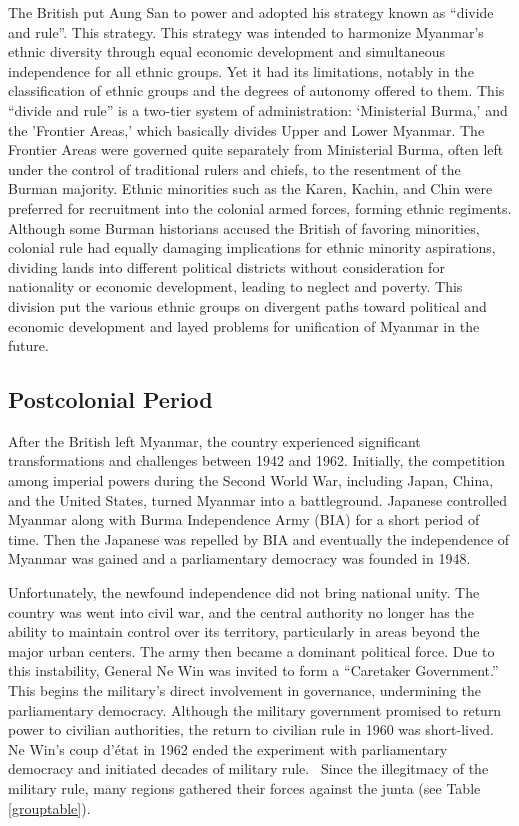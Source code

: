 \documentclass{article}
\begin{document}
The British put Aung San to power and adopted his strategy known as ``divide and rule''. This strategy. This strategy was intended to harmonize Myanmar's ethnic diversity through equal economic development and simultaneous independence for all ethnic groups. Yet it had its limitations, notably in the classification of ethnic groups and the degrees of autonomy offered to them. This ``divide and rule'' is a two-tier system of administration: `Ministerial Burma,' and the 'Frontier Areas,' which basically divides Upper and Lower Myanmar. The Frontier Areas were governed quite separately from Ministerial Burma, often left under the control of traditional rulers and chiefs, to the resentment of the Burman majority. Ethnic minorities such as the Karen, Kachin, and Chin were preferred for recruitment into the colonial armed forces, forming ethnic regiments. Although some Burman historians accused the British of favoring minorities, colonial rule had equally damaging implications for ethnic minority aspirations, dividing lands into different political districts without consideration for nationality or economic development, leading to neglect and poverty. This division put the various ethnic groups on divergent paths toward political and economic development and layed problems for unification of Myanmar in the future.\autocite[18-23]{smithEthnicGroupsBurma1994}


\subsection{Postcolonial Period}

After the British left Myanmar, the country experienced significant transformations and challenges between 1942 and 1962. Initially, the competition among imperial powers during the Second World War, including Japan, China, and the United States, turned Myanmar into a battleground. Japanese controlled Myanmar along with Burma Independence Army (BIA) for a short period of time. Then the Japanese was repelled by BIA and eventually the independence of Myanmar was gained and a parliamentary democracy was founded in 1948.~\autocite[225-238]{aung-thwinHistoryMyanmarAncient2012}

Unfortunately, the newfound independence did not bring national unity. The country was went into civil war, and the central authority no longer has the ability to maintain control over its territory, particularly in areas beyond the major urban centers. The army then became a dominant political force. Due to this instability, General Ne Win was invited to form a ``Caretaker Government.'' This begins the military's direct involvement in governance, undermining the parliamentary democracy. Although the military government promised to return power to civilian authorities, the return to civilian rule in 1960 was short-lived. Ne Win's coup d'état in 1962 ended the experiment with parliamentary democracy and initiated decades of military rule.~\autocite[238-244]{aung-thwinHistoryMyanmarAncient2012} Since the illegitmacy of the military rule, many regions gathered their forces against the junta (see Table \ref{grouptable}).
\end{document}
